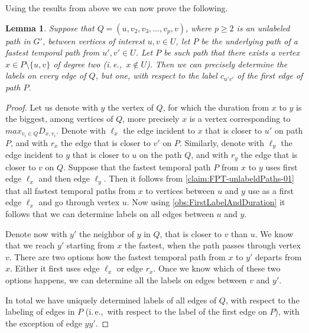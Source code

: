 \documentclass[11pt,a4paper]{article}
\newtheorem{lemma}[theorem]{Lemma}
\theoremstyle{remark}
\theoremstyle{definition}
\newcommand{\ie}{i.\,e.,\ }
\begin{document}
%
Using the results from above we can now prove the following.
\begin{lemma}\label{lem:FPT-DetermineLabelsOnUnlabeledNonFastestPaths}
    Suppose that $Q = (u,v_2,v_3, \dots, v_p, v)$, where $p \geq 2$ is an unlabeled path in $G'$, between vertices of interest $u,v \in U$,
    let $P$ be the underlying path of a fastest temporal path from $u',v' \in U$.
    Let $P$ be such path that there exists a vertex $x \in P \setminus \{u,v\}$ of degree two (\ie $x \notin U$).
    Then we can precisely determine the labels on every edge of $Q$, but one, with respect to the label $c_{u'v'}$ of the first edge of path $P$.
\end{lemma}
\begin{proof}
    Let us denote with $y$ the vertex of $Q$, for which the duration from $x$ to $y$ is the biggest, among vertices of $Q$,
    more precisely $x$ is a vertex corresponding to $max_{v_i \in Q} D_{x,v_i}$.
    Denote 
    with $\ell_x$ the edge incident to $x$ that is closer to $u'$ on path $P$, and with $r_x$ the edge that is closer to $v'$ on $P$.
    Similarly, denote with $\ell_y$ the edge incident to $y$ that is closer to $u$ on the path $Q$, and with $r_y$ the edge that is closer to $v$ on $Q$.
    Suppose that the fastest temporal path $P$ from $x$ to $y$ uses first edge $\ell_x$ and then edge $\ell_y$.
    Then it follows from \cref{claim:FPT-unlabeldPaths-01} that all fastest temporal paths from $x$ to vertices between $u$ and $y$ use as a first edge $\ell_x$ and go through vertex $u$. 
    Now using \cref{obs:FirstLabelAndDuration} it follows that we can determine labels on all edges between $u$ and $y$.

    Denote now with $y'$ the neighbor of $y$ in $Q$, that is closer to $v$ than $u$. 
    We know that we reach $y'$ starting from $x$ the fastest, when the path passes through vertex $v$.
    There are two options how the fastest temporal path from $x$ to $y'$ departs from $x$. Either it first uses edge $\ell_x$ or edge $r_x$. 
    Once we know which of these two options happens, we can determine all the labels on edges between $v$ and $y'$.

    In total we have uniquely determined labels of all edges of $Q$, with respect to the labeling of edges in $P$ (\ie with respect to the label of the first edge on $P$), with the exception of edge $yy'$.
\end{proof}
\end{document}
